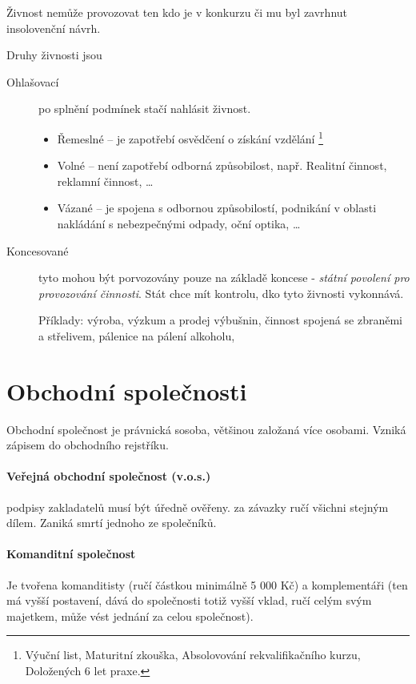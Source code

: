 \documentclass[10pt,a4paper,
twoside,%
]{report}
\begin{document}
Živnost nemůže provozovat ten kdo je v konkurzu či mu byl zavrhnut insolovenční návrh.

Druhy živnosti jsou 
\begin{description}
\item[Ohlašovací] po splnění podmínek stačí nahlásit živnost.
\begin{itemize}
\item Řemeslné -- je zapotřebí osvědčení o získání vzdělání \footnote{Výuční list, Maturitní zkouška, Absolovování rekvalifikačního kurzu, Doložených 6 let praxe.}
\item Volné -- není zapotřebí odborná způsobilost, např. \textsf{Realitní činnost, reklamní činnost, \dots}
\item Vázané -- je spojena s odbornou způsobilostí, podnikání v oblasti nakládání s nebezpečnými odpady, oční optika, \dots
\end{itemize}
\item[Koncesované] tyto mohou být porvozovány pouze na základě koncese - \emph{státní povolení pro provozování činnosti}. Stát chce mít kontrolu, dko tyto živnosti vykonnává.

Příklady: výroba, výzkum a prodej výbušnin, činnost spojená se zbraněmi a střelivem, pálenice na pálení alkoholu, 
\end{description}

\section{Obchodní společnosti}

Obchodní společnost je právnická sosoba, většinou založaná více osobami. Vzniká zápisem do obchodního rejstříku.

\paragraph{Veřejná obchodní společnost (v.o.s.)} podpisy zakladatelů musí být úředně ověřeny. za závazky ručí všichni stejným dílem. Zaniká smrtí jednoho ze společníků.

\paragraph{Komanditní společnost} Je tvořena komanditisty (ručí částkou minimálně 5 000 Kč) a komplementáři (ten má vyšší postavení, dává do společnosti totiž vyšší vklad, ručí celým svým majetkem, může vést jednání za celou společnost).
\end{document}
